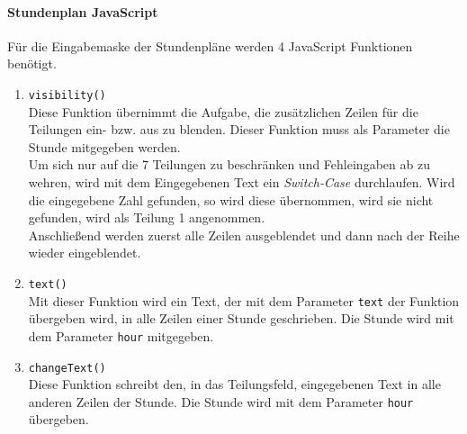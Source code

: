 \paragraph{Stundenplan JavaScript\\} \label{sec:content_imple_input_java_lessons}
Für die Eingabemaske der Stundenpläne werden 4 JavaScript Funktionen benötigt.
\begin{enumerate}
	\item \texttt{visibility()}\\
	Diese Funktion übernimmt die Aufgabe, die zusätzlichen Zeilen für die Teilungen ein- bzw. aus zu blenden. Dieser Funktion muss als Parameter die Stunde mitgegeben werden.\\
	Um sich nur auf die 7 Teilungen zu beschränken und Fehleingaben ab zu wehren, wird mit dem Eingegebenen Text ein \textit{Switch-Case} durchlaufen. Wird die eingegebene Zahl gefunden, so wird diese übernommen, wird sie nicht gefunden, wird als Teilung 1 angenommen.\\
	Anschließend werden zuerst alle Zeilen ausgeblendet und dann nach der Reihe wieder eingeblendet.
	
	
	
	\item \texttt{text()}\\
	Mit dieser Funktion wird ein Text, der mit dem Parameter \texttt{text} der Funktion übergeben wird, in alle Zeilen einer Stunde geschrieben. Die Stunde wird mit dem Parameter \texttt{hour} mitgegeben.
	
	
	
	\item \texttt{changeText()}\\
	Diese Funktion schreibt den, in das Teilungsfeld, eingegebenen Text in alle anderen Zeilen der Stunde. Die Stunde wird mit dem Parameter \texttt{hour} übergeben.
	
	
	

\end{enumerate}
